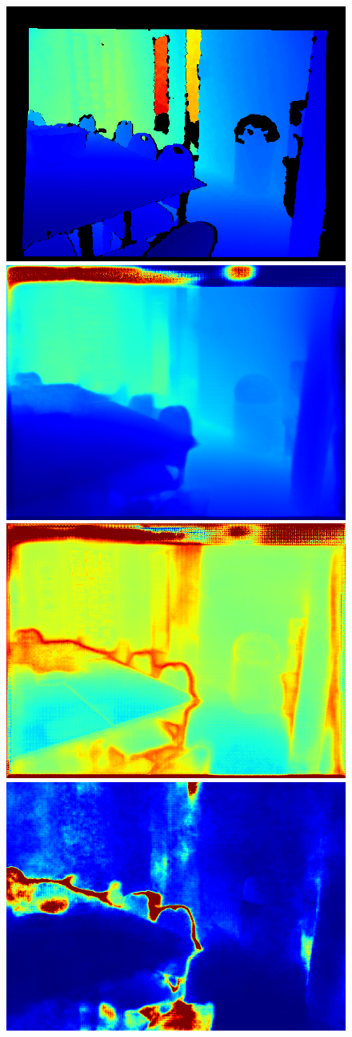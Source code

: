 \begin{figure}[p]
{\includegraphics[width=0.3\linewidth,trim={40 10 40 60},clip]{segnet_60_output_1.png}
\includegraphics[width=0.3\linewidth,trim={40 10 40 60},clip]{segnet_60_output_2.png}
\includegraphics[width=0.3\linewidth,trim={40 10 40 60},clip]{segnet_60_output_3.png}
\includegraphics[width=0.3\linewidth]{segnet_60_output_4.png}}
~
\end{figure}
